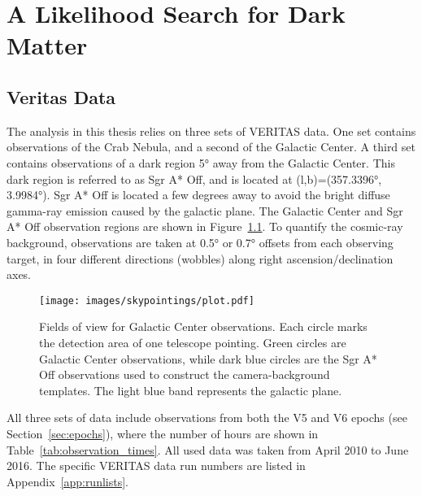 \cleartooddpage[\thispagestyle{empty}]
\newcommand{\Like}{L}
\newcommand{\LogLike}{\mathcal{L}}
\newcommand{\LogLikeMax}{\LogLike_{\textrm{max}}}
\newcommand{\xtrue}{x}
\newcommand{\xdet }{x'}
\newcommand{\ltrue}{l}
\newcommand{\ldet }{l'}
\newcommand{\btrue}{b}
\newcommand{\bdet }{b'}
\newcommand{\Etrue}{E}
\newcommand{\Edet }{E'}
\newcommand{\ttrue}{t}
\newcommand{\tdet }{t'}
\newcommand{\Aeff }{A_\textrm{eff }}
\newcommand{\Edisp}{E_\textrm{disp}}
\newcommand{\Mnull}{M_\textrm{null}}
\newcommand{\Malt }{M_\textrm{alt}}

\chapter{A Likelihood Search for Dark Matter}\label{chapter:analysis}

\section{Veritas Data}\label{veritasdata}
  The analysis in this thesis relies on three sets of VERITAS data.
  One set contains observations of the Crab Nebula, and a second of the Galactic Center.
  A third set contains observations of a dark region \nicetilde\ang{5} away from the Galactic Center.
  This dark region is referred to as  Sgr A* Off, and is located at (l,b)=(\ang{357.3396}, \ang{3.9984}).
  Sgr A* Off is located a few degrees away to avoid the bright diffuse gamma-ray emission caused by the galactic plane.
  The Galactic Center and Sgr A* Off observation regions are shown in Figure~\ref{fig:gcfieldsofview}.
  To quantify the cosmic-ray background, observations are taken at \ang{0.5} or \ang{0.7} offsets from each observing target, in four different directions (wobbles) along right ascension/declination axes.

  \begin{figure}[!ht]
    \centering
    \texttt{[image: images/skypointings/plot.pdf]}
    \caption[VERITAS Galactic Center Pointings]{
      Fields of view for Galactic Center observations.
      Each circle marks the detection area of one telescope pointing.
      Green circles are Galactic Center observations, while dark blue circles are the Sgr A* Off observations used to construct the camera-background templates.
      The light blue band represents the galactic plane.
    }
    \label{fig:gcfieldsofview}
  \end{figure}

  All three sets of data include observations from both the V5 and V6 epochs (see Section~\ref{sec:epochs}), where the number of hours are shown in Table~\ref{tab:observation_times}.
  All used data was taken from April 2010 to June 2016.
  The specific VERITAS data run numbers are listed in Appendix~\ref{app:runlists}.

